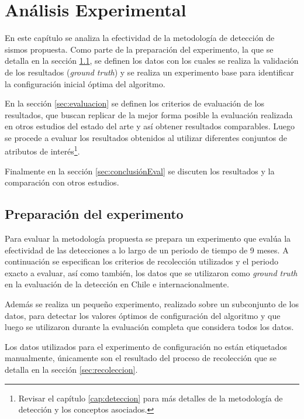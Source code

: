 

\chapter{Análisis Experimental}
\label{cap:analisis}

En este capítulo se analiza la efectividad de la metodología de detección de sismos propuesta. 
%
Como parte de la preparación del experimento, la que se detalla en la sección \ref{sec:preparacionExperimento}, se definen los datos con los cuales se realiza la validación de los resultados (\textit{ground truth})  y se realiza un experimento base para identificar la configuración inicial óptima del algoritmo.


En la sección \ref{sec:evaluacion} se definen los criterios de evaluación de los resultados, que buscan replicar de la mejor forma posible la evaluación realizada en otros estudios del estado del arte y así obtener resultados comparables.
%
Luego se procede a evaluar los resultados obtenidos al utilizar diferentes conjuntos de atributos de interés\footnote{Revisar el capítulo \ref{cap:deteccion} para más detalles de la metodología de detección y los conceptos asociados.}.

Finalmente en la sección \ref{sec:conclusiónEval} se discuten los resultados y la comparación con otros estudios. 

\section{Preparación del experimento}
\label{sec:preparacionExperimento}

Para evaluar la metodología propuesta se prepara un experimento que evalúa la efectividad de las detecciones a lo largo de un periodo de tiempo de 9 meses. A continuación se especifican los criterios de recolección utilizados y el periodo exacto a evaluar, así como también, los datos que se utilizaron como \textit{ground truth} en la evaluación de la detección en Chile e internacionalmente. 

Además se realiza un pequeño experimento, realizado sobre un subconjunto de los datos, para detectar los valores óptimos de configuración del algoritmo y que luego se utilizaron durante la evaluación completa que considera todos los datos.

Los datos utilizados para el experimento de configuración no están etiquetados manualmente, únicamente son el resultado del proceso de recolección que se detalla en la sección \ref{sec:recoleccion}.

